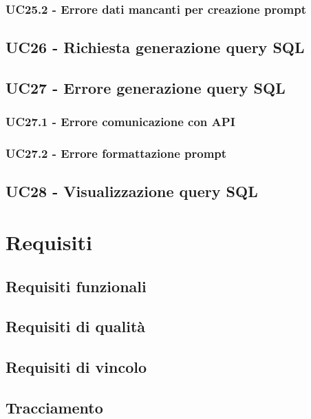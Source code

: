\documentclass[5pt]{article}
\begin{document}
\subsubsection{UC25.2 - Errore dati mancanti per creazione prompt}
\label{sec:UC25.2}

\subsection{UC26 - Richiesta generazione query SQL}
\label{sec:UC26}

\subsection{UC27 - Errore generazione query SQL}
\label{sec:UC27}

\subsubsection{UC27.1 - Errore comunicazione con API}
\label{sec:UC27.1}

\subsubsection{UC27.2 - Errore formattazione prompt}
\label{sec:UC27.2}

\subsection{UC28 - Visualizzazione query SQL}
\label{sec:UC28}


\section{Requisiti}
\subsection{Requisiti funzionali}
\subsection{Requisiti di qualità}
\subsection{Requisiti di vincolo}
\subsection{Tracciamento}
\end{document}
